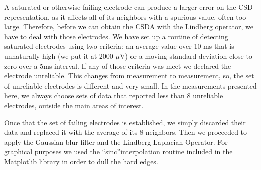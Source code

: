 \documentclass{article}
\begin{document}
A saturated or otherwise failing electrode can produce a larger error on the CSD representation,
as it affects all of its neighbors with a spurious value, often too large.
Therefore, before we can obtain the CSDA with the Lindberg operator, we have to deal with those
electrodes.
We have set up a routine of detecting saturated electrodes using two criteria: an average value over
10 ms that is unnaturally high (we put it at 2000 $\mu$V) or a moving standard deviation close to zero
over a 5ms interval. If any of those criteria was meet we declared the electrode unreliable. This changes
from measurement to measurement, so, the set of unreliable electrodes is different and very small.
In the measurements presented here, we always choose sets of data that reported less than 8 unreliable
electrodes, outside the main areas of interest.

Once that the set of failing electrodes is established, we simply discarded their data and replaced
it with the average of its 8 neighbors. Then we proceeded to apply the Gaussian blur filter and the Lindberg
Laplacian Operator. For graphical purposes we used the ``sinc''interpolation
routine included in the Matplotlib library \cite{Matplotlib} in order to dull the hard edges. 





\end{document}
